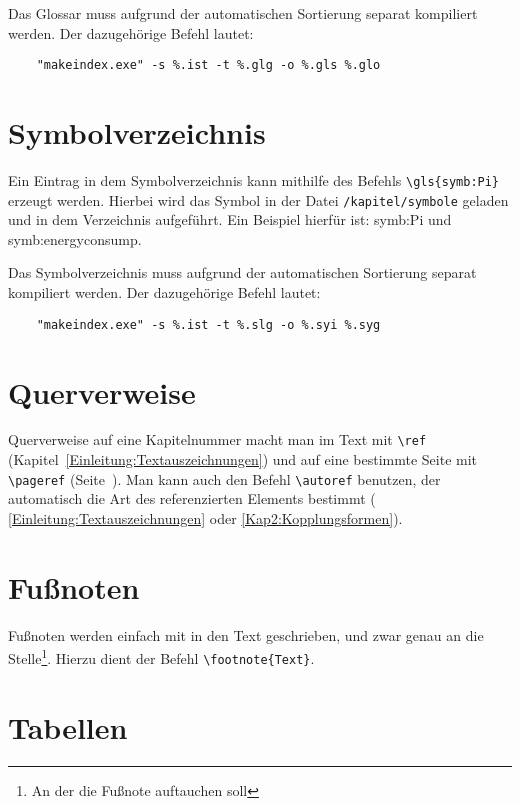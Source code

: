 Das Glossar muss aufgrund der automatischen Sortierung separat kompiliert werden. Der dazugehörige Befehl lautet: 
\begin{verbatim}
	"makeindex.exe" -s %.ist -t %.glg -o %.gls %.glo
\end{verbatim}



\section{Symbolverzeichnis}
Ein Eintrag in dem Symbolverzeichnis kann mithilfe des Befehls \verb*|\gls{symb:Pi}| erzeugt werden. Hierbei wird das Symbol in der Datei \texttt{/kapitel/symbole} geladen und in dem Verzeichnis aufgeführt. Ein Beispiel hierfür ist: \gls{symb:Pi} und \gls{symb:energyconsump}. 

Das Symbolverzeichnis muss aufgrund der automatischen Sortierung separat kompiliert werden. Der dazugehörige Befehl lautet: 

\begin{verbatim}
	"makeindex.exe" -s %.ist -t %.slg -o %.syi %.syg
\end{verbatim}




\section{Querverweise}

Querverweise auf eine Kapitelnummer macht man im Text mit \verb+\ref+ (Kapitel~\ref{Einleitung:Textauszeichnungen}) und auf eine bestimmte Seite mit \verb+\pageref+ (Seite~\pageref{Einleitung:Textauszeichnungen}). Man kann auch den Befehl \verb+\autoref+ benutzen, der automatisch die Art des referenzierten Elements bestimmt (\zb{} \autoref{Einleitung:Textauszeichnungen} oder \autoref{Kap2:Kopplungsformen}).


\section{Fußnoten}

Fußnoten werden einfach mit in den Text geschrieben, und zwar genau an die Stelle\footnote{An der die Fußnote auftauchen soll}. Hierzu dient der Befehl \verb+\footnote{Text}+.


\section{Tabellen}

